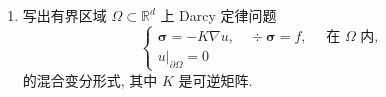 \begin{enumerate}
\item 
写出有界区域 $\Omega\subset\mathbb R^d$ 上 Darcy 定律问题
$$
\begin{cases}    
\boldsymbol{\sigma}=-K\nabla u, \quad \div\boldsymbol{\sigma}=f, \quad \textrm{ 在 $\Omega$ 内}, \\
u|_{\partial\Omega}=0
\end{cases}
$$
的混合变分形式, 其中 $K$ 是可逆矩阵.
\end{enumerate}

